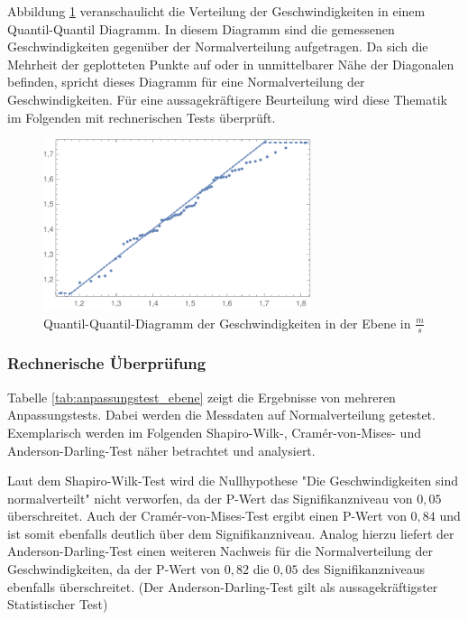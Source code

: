 Abbildung \ref{fig:qqplot_ebene} veranschaulicht die Verteilung der Geschwindigkeiten in einem Quantil-Quantil Diagramm. In diesem Diagramm sind die gemessenen Geschwindigkeiten gegenüber der Normalverteilung aufgetragen. Da sich die Mehrheit der geplotteten Punkte auf oder in unmittelbarer Nähe der Diagonalen befinden, spricht dieses Diagramm für eine Normalverteilung der Geschwindigkeiten. Für eine aussagekräftigere Beurteilung wird diese Thematik im Folgenden mit rechnerischen Tests überprüft.
\begin{figure}[htpb]
\centering
\includegraphics[width=0.7\textwidth]{abbildungen/QQ_Plot_2017_Ebene.pdf}
\caption{Quantil-Quantil-Diagramm der Geschwindigkeiten in der Ebene in $\frac{m}{s}$}
\label{fig:qqplot_ebene}
\end{figure}

\subsubsection{Rechnerische Überprüfung}

Tabelle \ref{tab:anpassungstest_ebene} zeigt die Ergebnisse von mehreren Anpassungstests. Dabei werden die Messdaten auf Normalverteilung getestet. Exemplarisch werden im Folgenden Shapiro-Wilk-, Cramér-von-Mises- und Anderson-Darling-Test näher betrachtet und analysiert.  

Laut dem Shapiro-Wilk-Test wird die Nullhypothese "Die Geschwindigkeiten sind normalverteilt" nicht verworfen, da der P-Wert das Signifikanzniveau von $0,05$ überschreitet. Auch der Cramér-von-Mises-Test ergibt einen P-Wert von $0,84$ und ist somit ebenfalls deutlich über dem Signifikanzniveau. Analog hierzu liefert der Anderson-Darling-Test einen weiteren Nachweis für die Normalverteilung der Geschwindigkeiten, da der P-Wert von $0,82$ die $0,05$ des Signifikanzniveaus ebenfalls überschreitet. (Der Anderson-Darling-Test gilt als aussagekräftigster Statistischer Test)

